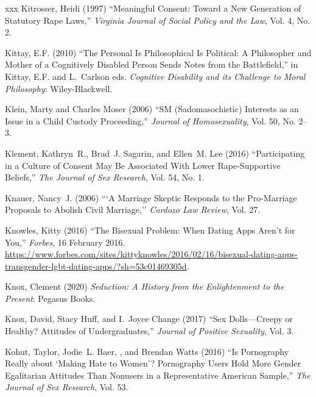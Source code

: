 \documentclass[]{jlreq} \usepackage{mystyle}
\begin{document}
\begin{thebibliography}{xxx}
Kitrosser, Heidi (1997) ``Meaningful Consent: Toward a New Generation of
  Statutory Rape Laws,'' \textit{ Virginia Journal of Social Policy and the
  Law}, Vol. 4, No. 2.

Kittay, E.F. (2010) ``The Personal Is Philosophical Is Political: A Philosopher
  and Mother of a Cognitively Disabled Person Sends Notes from the
  Battlefield,'' in Kittay, E.F. and L.~Carlson eds.   \textit{ Cognitive
  Disability and its Challenge to Moral Philosophy}: Wiley-Blackwell.

Klein, Marty and Charles Moser (2006) ``SM (Sadomasochistic) Interests as an
  Issue in a Child Custody Proceeding,'' \textit{ Journal of Homosexuality},
  Vol. 50, No. 2--3.

Klement, Kathryn~R., Brad~J. Sagarin, and Ellen~M. Lee (2016) ``Participating
  in a Culture of Consent May Be Associated With Lower Rape-Supportive
  Beliefs,'' \textit{ The Journal of Sex Research}, Vol. 54, No. 1.

Knauer, Nancy~J. (2006) ```A Marriage Skeptic Responds to the Pro-Marriage
  Proposals to Abolish Civil Marriage,'' \textit{ Cardozo Law Review}, Vol. 27.

Knowles, Kitty (2016) ``The Bisexual Problem: When Dating Apps Aren't for
  You,'' \emph{Forbes}, 16 February 2016.
  \url{https://www.forbes.com/sites/kittyknowles/2016/02/16/bisexual-dating-apps-transgender-lgbt-dating-apps/?sh=53c01469305d}.

Knox, Clement (2020)  \textit{ Seduction: A History from the Enlightenment to
  the Present}: Pegasus Books.

Knox, David, Stacy Huff, and I.~Joyce Change (2017) ``Sex Dolls---Creepy or
  Healthy? Attitudes of Undergraduates,'' \textit{ Journal of Positive
  Sexuality}, Vol. 3.

Kohut, Taylor, Jodie~L. Baer, , and Brendan Watts (2016) ``Is Pornography
  Really about `Making Hate to Women'? Pornography Users Hold More Gender
  Egalitarian Attitudes Than Nonusers in a Representative American Sample,''
  \textit{ The Journal of Sex Research}, Vol. 53.


\end{thebibliography}
\end{document}
